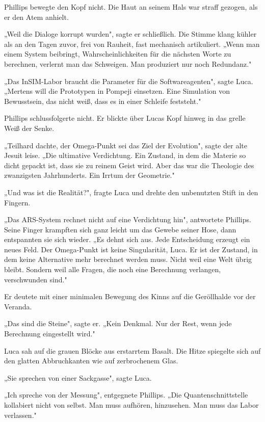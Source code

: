 \documentclass[
  ngerman,
]{article}
\begin{document}
Phillips bewegte den Kopf nicht. Die Haut an seinem Hals war straff
gezogen, als er den Atem anhielt.

„Weil die Dialoge korrupt wurden", sagte er schließlich. Die Stimme
klang kühler als an den Tagen zuvor, frei von Rauheit, fast mechanisch
artikuliert. „Wenn man einem System beibringt, Wahrscheinlichkeiten für
die nächsten Worte zu berechnen, verlernt man das Schweigen. Man
produziert nur noch Redundanz."

„Das InSIM-Labor braucht die Parameter für die Softwareagenten", sagte
Luca. „Mertens will die Prototypen in Pompeji einsetzen. Eine Simulation
von Bewusstsein, das nicht weiß, dass es in einer Schleife feststeht."

Phillips schlussfolgerte nicht. Er blickte über Lucas Kopf hinweg in das
grelle Weiß der Senke.

„Teilhard dachte, der Omega-Punkt sei das Ziel der Evolution", sagte der
alte Jesuit leise. „Die ultimative Verdichtung. Ein Zustand, in dem die
Materie so dicht gepackt ist, dass sie zu reinem Geist wird. Aber das
war die Theologie des zwanzigsten Jahrhunderts. Ein Irrtum der
Geometrie."

„Und was ist die Realität?", fragte Luca und drehte den unbenutzten
Stift in den Fingern.

„Das ARS-System rechnet nicht auf eine Verdichtung hin", antwortete
Phillips. Seine Finger krampften sich ganz leicht um das Gewebe seiner
Hose, dann entspannten sie sich wieder. „Es dehnt sich aus. Jede
Entscheidung erzeugt ein neues Feld. Der Omega-Punkt ist keine
Singularität, Luca. Er ist der Zustand, in dem keine Alternative mehr
berechnet werden muss. Nicht weil eine Welt übrig bleibt. Sondern weil
alle Fragen, die noch eine Berechnung verlangen, verschwunden sind."

Er deutete mit einer minimalen Bewegung des Kinns auf die Geröllhalde
vor der Veranda.

„Das sind die Steine", sagte er. „Kein Denkmal. Nur der Rest, wenn jede
Berechnung eingestellt wird."

Luca sah auf die grauen Blöcke aus erstarrtem Basalt. Die Hitze
spiegelte sich auf den glatten Abbruchkanten wie auf zerbrochenem Glas.

„Sie sprechen von einer Sackgasse", sagte Luca.

„Ich spreche von der Messung", entgegnete Phillips. „Die
Quantenschnittstelle kollabiert nicht von selbst. Man muss aufhören,
hinzusehen. Man muss das Labor verlassen."
\end{document}
